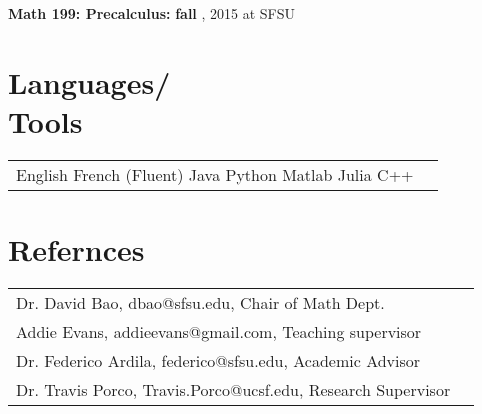 \documentclass[margin,line,pifont,palatino,courier]{res}
\newenvironment{list1}{
  \begin{list}{\label{ } }{
      \setlength{\itemsep}{0in}
      \setlength{\parsep}{0in} \setlength{\parskip}{0in}
      \setlength{\topsep}{0in} \setlength{\partopsep}{0in}
      \setlength{\leftmargin}{0.0in} } }{\end{list} }
\begin{document}
\begin{resume}
\begin{list1}
        \item  {\bf Math 199: Precalculus:}\textbf{ fall  },  2015 at SFSU
    

  \end{list1}


\section{\sc Languages/ \\ Tools}
  \begin{tabular}{@{}p{6in}p{3in}}
     English  French (Fluent)  Java  Python  Matlab  Julia  C++ 
  \end{tabular}

\section{\sc Refernces}
\begin{tabular}{@{}p{6in}p{3in}}
     Dr. David Bao, dbao@sfsu.edu, Chair of Math Dept. \\  Addie Evans, addieevans@gmail.com, Teaching supervisor \\  Dr. Federico Ardila, federico@sfsu.edu, Academic Advisor \\  Dr. Travis Porco, Travis.Porco@ucsf.edu, Research Supervisor \\ 
  \end{tabular}
   

\end{resume}
\end{document}
